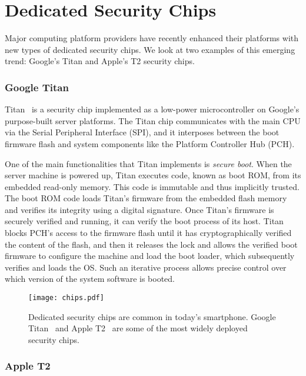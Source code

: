 \section*{Dedicated Security Chips}

Major computing platform providers have recently enhanced their platforms with new types of dedicated security chips. We look at two examples of this emerging trend: Google's Titan and Apple's T2 security chips.

\subsubsection*{Google Titan}

Titan~\cite{titan} is a security chip implemented as a low-power microcontroller on Google's purpose-built server platforms. The Titan chip communicates with the main CPU via the Serial Peripheral Interface (SPI), and it interposes between the boot firmware flash and system components like the Platform Controller Hub (PCH).

 One of the main functionalities that Titan implements is \emph{secure boot}. When the server machine is powered up, Titan executes code, known as boot ROM, from its embedded read-only memory. This code is immutable and thus implicitly trusted. The boot ROM code loads Titan's firmware from the embedded flash memory and verifies its integrity using a digital signature. Once Titan's firmware is securely verified and running, it can verify the boot process of its host. Titan blocks PCH's access to the firmware flash until it has cryptographically verified the content of the flash, and then it releases the lock and allows the verified boot firmware to configure the machine and load the boot loader, which subsequently verifies and loads the OS. Such an iterative process allows precise control over which version of the system software is booted. 

\begin{figure}[t]
    \centering
    \texttt{[image: chips.pdf]}
    \caption{Dedicated security chips are common in today's smartphone. Google Titan~\cite{titan} and Apple T2~\cite{t2} are some of the most widely deployed security chips.}
\label{fig:prototype}   
\end{figure}

 
\subsubsection*{Apple T2}
 
